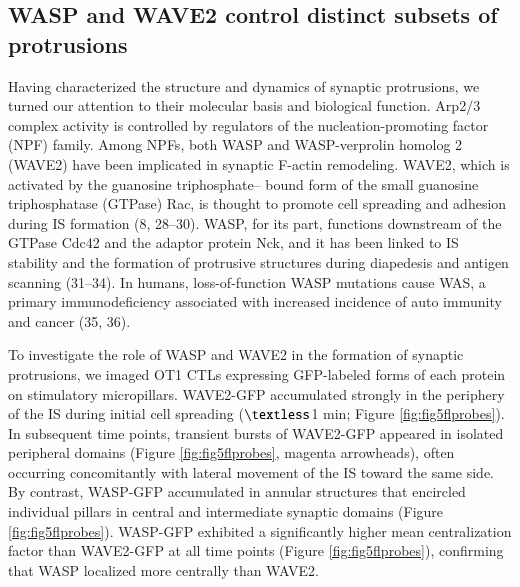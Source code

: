 \subsection{WASP and WAVE2 control distinct subsets of protrusions}
Having characterized the structure and dynamics of synaptic protrusions, we turned our attention to their molecular basis and biological function. Arp2/3 complex activity is controlled by regulators of the nucleation-promoting factor (NPF) family. Among NPFs, both WASP and WASP-verprolin homolog 2 (WAVE2) have been implicated in synaptic F-actin remodeling. WAVE2, which is activated by the guanosine triphosphate– bound form of the small guanosine triphosphatase (GTPase) Rac, is thought to promote cell spreading and adhesion during IS formation (8, 28–30). WASP, for its part, functions downstream of the GTPase Cdc42 and the adaptor protein Nck, and it has been linked to IS stability and the formation of protrusive structures during diapedesis and antigen scanning (31–34). In humans, loss-of-function WASP mutations cause WAS, a primary immunodeficiency associated with increased incidence of auto immunity and cancer (35, 36).

To investigate the role of WASP and WAVE2 in the formation of synaptic protrusions, we imaged OT1 CTLs expressing GFP-labeled forms of each protein on stimulatory micropillars. WAVE2-GFP accumulated strongly in the periphery of the IS during initial cell spreading ($\textless$1 min; Figure \ref{fig:fig5flprobes}). In subsequent time points, transient bursts of WAVE2-GFP appeared in isolated peripheral domains (Figure \ref{fig:fig5flprobes}, magenta arrowheads), often occurring concomitantly with lateral movement of the IS toward the same side. By contrast, WASP-GFP accumulated in annular structures that encircled individual pillars in central and intermediate synaptic domains (Figure \ref{fig:fig5flprobes}). WASP-GFP exhibited a significantly higher mean centralization factor than WAVE2-GFP at all time points (Figure \ref{fig:fig5flprobes}), confirming that WASP localized more centrally than WAVE2.

